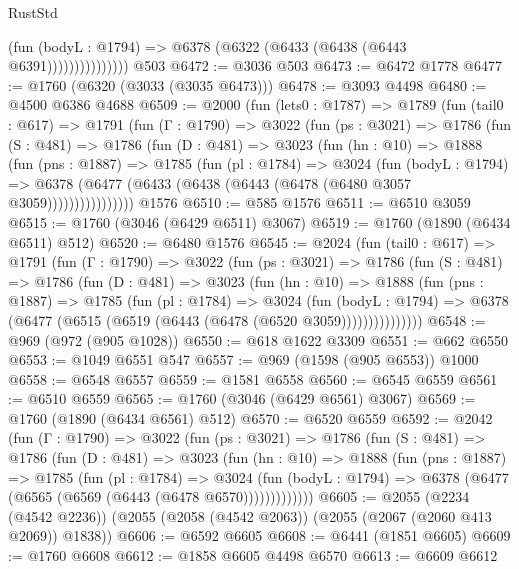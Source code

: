 \begin{lexlean}{RustStd}
\begin{coremodule}
                        (fun (bodyL : @1794) =>
                        @6378 (@6322 (@6433 (@6438 (@6443 @6391)))))))))))))))
    @503
@6472 := @3036 @503
@6473 := @6472 @1778
@6477 := @1760 (@6320 (@3033 (@3035 @6473)))
@6478 := @3093 @4498
@6480 := @4500 @6386 @4688
@6509 := @2000
    (fun (lets0 : @1787) =>
    @1789
      (fun (tail0 : @617) =>
      @1791
        (fun (Γ : @1790) =>
        @3022
          (fun (ps : @3021) =>
          @1786
            (fun (S : @481) =>
            @1786
              (fun (D : @481) =>
              @3023
                (fun (hn : @10) =>
                @1888
                  (fun (pns : @1887) =>
                  @1785
                    (fun (pl : @1784) =>
                    @3024
                      (fun (bodyL : @1794) =>
                      @6378 (@6477 (@6433 (@6438 (@6443 (@6478 (@6480 @3057 @3059))))))))))))))))
    @1576
@6510 := @585 @1576
@6511 := @6510 @3059
@6515 := @1760 (@3046 (@6429 @6511) @3067)
@6519 := @1760 (@1890 (@6434 @6511) @512)
@6520 := @6480 @1576
@6545 := @2024
    (fun (tail0 : @617) =>
    @1791
      (fun (Γ : @1790) =>
      @3022
        (fun (ps : @3021) =>
        @1786
          (fun (S : @481) =>
          @1786
            (fun (D : @481) =>
            @3023
              (fun (hn : @10) =>
              @1888
                (fun (pns : @1887) =>
                @1785
                  (fun (pl : @1784) =>
                  @3024
                    (fun (bodyL : @1794) =>
                    @6378 (@6477 (@6515 (@6519 (@6443 (@6478 (@6520 @3059)))))))))))))))
@6548 := @969 (@972 (@905 @1028))
@6550 := @618 @1622 @3309
@6551 := @662 @6550
@6553 := @1049 @6551 @547
@6557 := @969 (@1598 (@905 @6553)) @1000
@6558 := @6548 @6557
@6559 := @1581 @6558
@6560 := @6545 @6559
@6561 := @6510 @6559
@6565 := @1760 (@3046 (@6429 @6561) @3067)
@6569 := @1760 (@1890 (@6434 @6561) @512)
@6570 := @6520 @6559
@6592 := @2042
    (fun (Γ : @1790) =>
    @3022
      (fun (ps : @3021) =>
      @1786
        (fun (S : @481) =>
        @1786
          (fun (D : @481) =>
          @3023
            (fun (hn : @10) =>
            @1888
              (fun (pns : @1887) =>
              @1785
                (fun (pl : @1784) =>
                @3024
                  (fun (bodyL : @1794) =>
                  @6378 (@6477 (@6565 (@6569 (@6443 (@6478 @6570)))))))))))))
@6605 := @2055
    (@2234 (@4542 @2236))
    (@2055 (@2058 (@4542 @2063)) (@2055 (@2067 (@2060 @413 @2069)) @1838))
@6606 := @6592 @6605
@6608 := @6441 (@1851 @6605)
@6609 := @1760 @6608
@6612 := @1858 @6605 @4498 @6570
@6613 := @6609 @6612

\end{coremodule}
\end{lexlean}

